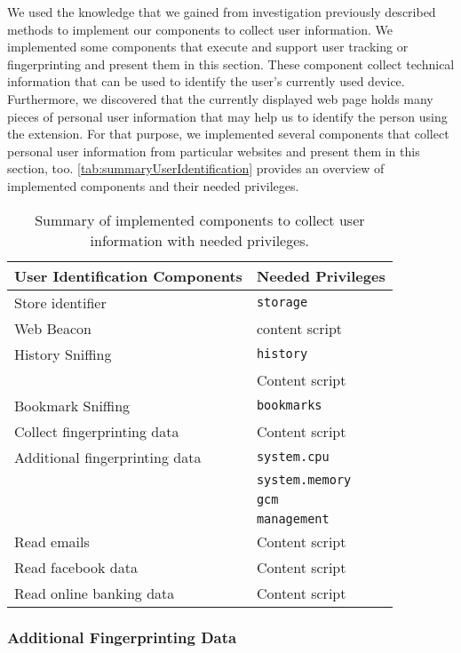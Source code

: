 	We used the knowledge that we gained from investigation previously described methods to implement our components to collect user information. We implemented some components that execute and support user tracking or fingerprinting and present them in this section. These component collect technical information that can be used to identify the user's currently used device. Furthermore, we discovered that the currently displayed web page holds many pieces of personal user information that may help us to identify the person using the extension. For that purpose, we implemented several components that collect personal user information from particular websites and present them in this section, too. \autoref{tab:summaryUserIdentification} provides an overview of implemented components and their needed privileges.
  	
  	\begin{table}[h]
  		\centering
  		\begin{tabular}{|l|l|} \hline 
  			\textbf{User Identification Components} & \textbf{Needed Privileges} \\ \hline
  			Store identifier & \texttt{storage} \\ 	\hline
  			Web Beacon & content script \\ \hline
  			History Sniffing & \texttt{history} \\
  			& Content script \\	\hline
  			Bookmark Sniffing & \texttt{bookmarks} \\ \hline
  			Collect fingerprinting data & Content script \\ \hline
  			Additional fingerprinting data & \texttt{system.cpu} \\
  			& \texttt{system.memory} \\
  			& \texttt{gcm} \\
  			& \texttt{management} \\ \hline
  			Read emails & Content script \\ 
  			Read facebook data & Content script \\
  			Read online banking data & Content script \\ \hline
  		\end{tabular}
  		\caption{Summary of implemented components to collect user information with needed privileges.}
  		\label{tab:summaryUserIdentification}
  	\end{table}
  
\subsubsection{Additional Fingerprinting Data} 
\label{sec:additionalFingerprintingData}


